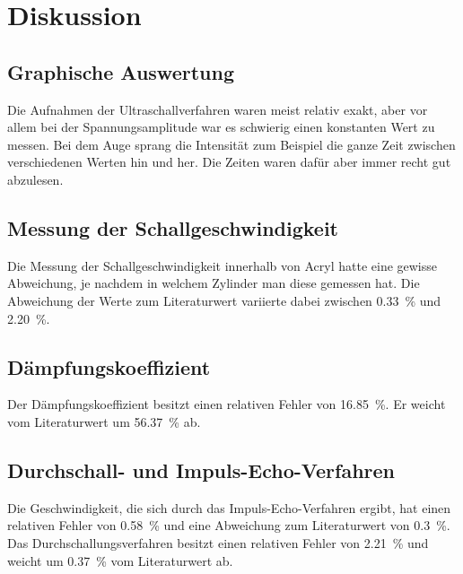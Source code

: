 \section{Diskussion}
\label{sec:Diskussion}

\subsection{Graphische Auswertung}
Die Aufnahmen der Ultraschallverfahren waren meist relativ exakt, aber vor allem bei der Spannungsamplitude war es schwierig einen 
konstanten Wert zu messen. Bei dem Auge sprang die Intensität zum Beispiel die ganze Zeit zwischen verschiedenen Werten hin und her. 
Die Zeiten waren dafür aber immer recht gut abzulesen.

\subsection{Messung der Schallgeschwindigkeit}
Die Messung der Schallgeschwindigkeit innerhalb von Acryl hatte eine gewisse Abweichung, je nachdem in welchem Zylinder man diese gemessen hat. 
Die Abweichung der Werte zum Literaturwert variierte dabei zwischen \SI{0.33}{\percent} und \SI{2.20}{\percent}. 

\subsection{Dämpfungskoeffizient}
Der Dämpfungskoeffizient besitzt einen relativen Fehler von \SI{16.85}{\percent}. Er weicht vom Literaturwert um \SI{56.37}{\percent} ab.  

\subsection{Durchschall- und Impuls-Echo-Verfahren} 
Die Geschwindigkeit, die sich durch das Impuls-Echo-Verfahren ergibt, hat einen relativen Fehler von \SI{0.58}{\percent} und eine Abweichung 
zum Literaturwert von \SI{0.3}{\percent}. Das Durchschallungsverfahren besitzt einen relativen Fehler von \SI{2.21}{\percent} und weicht um 
\SI{0.37}{\percent} vom Literaturwert ab.

